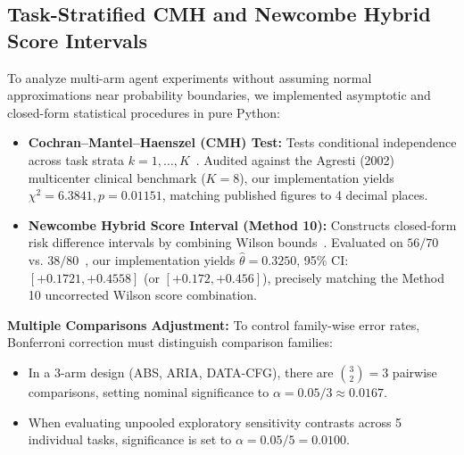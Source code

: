 \documentclass[11pt,a4paper]{article}
\begin{document}
\subsection{Task-Stratified CMH and Newcombe Hybrid Score Intervals}
To analyze multi-arm agent experiments without assuming normal approximations near probability boundaries, we implemented asymptotic and closed-form statistical procedures in pure Python:
\begin{itemize}
    \item \textbf{Cochran--Mantel--Haenszel (CMH) Test:} Tests conditional independence across task strata $k=1, \dots, K$~\cite{mantel1959statistical}. Audited against the Agresti (2002)~\cite{agresti2002categorical} multicenter clinical benchmark ($K=8$), our implementation yields $\chi^2 = 6.3841, p = 0.01151$, matching published figures to 4 decimal places.
    \item \textbf{Newcombe Hybrid Score Interval (Method 10):} Constructs closed-form risk difference intervals by combining Wilson bounds~\cite{wilson1927probable}. Evaluated on $56/70$ vs. $38/80$~\cite{newcombe1998interval}, our implementation yields $\hat{\theta} = 0.3250$, 95\% CI: $[+0.1721, +0.4558]$ (or $[+0.172, +0.456]$), precisely matching the Method 10 uncorrected Wilson score combination.
\end{itemize}

\textbf{Multiple Comparisons Adjustment:} To control family-wise error rates, Bonferroni correction must distinguish comparison families:
\begin{itemize}
    \item In a 3-arm design (ABS, ARIA, DATA-CFG), there are $\binom{3}{2} = 3$ pairwise comparisons, setting nominal significance to $\alpha = 0.05 / 3 \approx 0.0167$.
    \item When evaluating unpooled exploratory sensitivity contrasts across 5 individual tasks, significance is set to $\alpha = 0.05 / 5 = 0.0100$.
\end{itemize}
\end{document}
